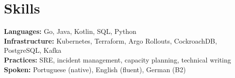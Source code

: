 \documentclass[10pt,a4paper]{article}
\begin{document}
\section*{Skills}
\textbf{Languages:} Go, Java, Kotlin, SQL, Python\\
\textbf{Infrastructure:} Kubernetes, Terraform, Argo Rollouts, CockroachDB, PostgreSQL, Kafka\\
\textbf{Practices:} SRE, incident management, capacity planning, technical writing\\
\textbf{Spoken:} Portuguese (native), English (fluent), German (B2)\\
\end{document}
